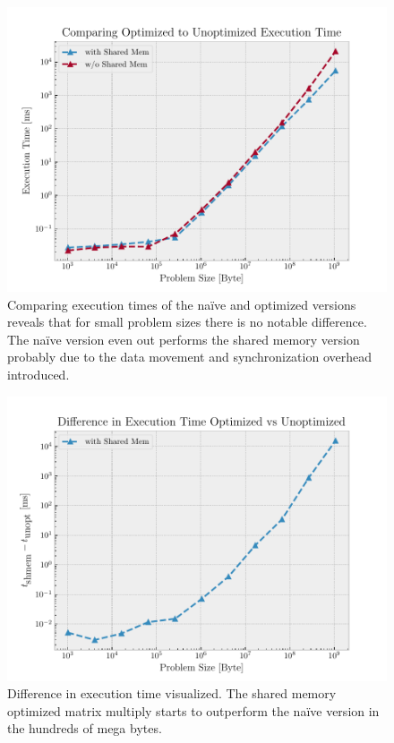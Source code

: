 \documentclass[12pt]{article}
\begin{document}
\begin{figure}[htpb]
	\centering
	\includegraphics[width=1\linewidth]{../eval/compare.pdf}
	\caption{Comparing execution times of the naïve and optimized versions
	reveals that for small problem sizes there is no notable difference.
The naïve version even out performs the shared memory version probably due to
the data movement and synchronization overhead introduced.}%
	\label{fig:../eval/compare}
\end{figure}

\begin{figure}[htpb]
	\centering
	\includegraphics[width=1\linewidth]{../eval/diff.pdf}
	\caption{Difference in execution time visualized. The shared memory
	optimized matrix multiply starts to outperform the naïve version in
the hundreds of mega bytes.}%
	\label{fig:../eval/diff}
\end{figure}
\end{document}
